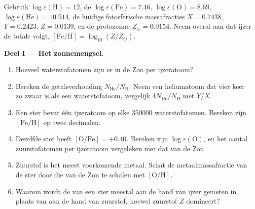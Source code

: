 \begin{problem}
\label{pb:b3:origin-of-elements:1}
Gebruik $\log\varepsilon(\mathrm{H}) = 12$, de 
$\log\varepsilon(\mathrm{Fe}) = 7.46$, $\log\varepsilon(\mathrm{O}) =
8.69$, $\log\varepsilon(\mathrm{He}) = 10.914$, de huidige
fotosferische massafracties $X = 0.7438$, $Y = 0.2423$, $Z = 0.0139$,
en de protozonne $Z_\odot = 0.0154$. Neem overal aan dat ijzer
de totale  volgt, $[\mathrm{Fe/H}] = \log_{10}(Z/Z_\odot)$.

\medskip\noindent\textbf{Deel I --- Het zonnemengsel.}
\begin{enumerate}
\item Hoeveel waterstofatomen zijn er in de Zon per ijzeratoom?
\item Bereken de getalsverhouding $N_\mathrm{He}/N_\mathrm{H}$. Neem een
  heliumatoom dat vier keer zo zwaar is als een waterstofatoom, vergelijk
  $4N_\mathrm{He}/N_\mathrm{H}$ met $Y/X$.
\item Een ster bevat één ijzeratoom op elke \num{350000} waterstofatomen.
  Bereken zijn $[\mathrm{Fe/H}]$ op twee decimalen.
\item Dezelfde ster heeft $[\mathrm{O/Fe}] = +0.40$. Bereken zijn
  $\log\varepsilon(\mathrm{O})$, en het aantal zuurstofatomen per ijzeratoom
  vergeleken met dat van de Zon.
\item Zuurstof is het meest voorkomende metaal. Schat de metaalmassafractie van de ster
  door die van de Zon te schalen met $[\mathrm{O/H}]$.
\item Waarom wordt de  van een ster meestal aan de hand van ijzer gemeten
  in plaats van aan de hand van zuurstof, hoewel zuurstof $Z$ domineert?
\end{enumerate}


\end{problem}
